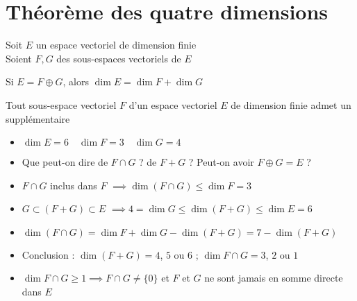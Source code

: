 \section{Théorème des quatre dimensions}

\begin{frame}
Soit $E$ un espace vectoriel de dimension finie \\
Soient $F,G$ des sous-espaces vectoriels de $E$
\begin{theoreme}
\end{theoreme}

\medskip
\pause

\begin{corollaire}
Si $E = F \oplus G$, alors $\dim E = \dim F + \dim G$
\end{corollaire}

\medskip
\pause

\begin{corollaire}
Tout sous-espace vectoriel $F$ d'un espace vectoriel $E$
de dimension finie admet un supplémentaire
\end{corollaire}

\end{frame}


\begin{frame}
\begin{exemple}
\begin{itemize}
\item
$\dim E = 6 \quad \dim F = 3 \quad \dim G = 4$

\pause
\item
Que peut-on dire de $F\cap G$ ? de $F+G$ ? Peut-on avoir $F\oplus G=E$ ?
  \pause

  \item $F \cap G$  inclus dans $F$  $\implies \dim (F \cap G) \le \dim F=3$
 
  
  \pause
  \item $G \subset (F+G) \subset E$ 
  $\implies 4=\dim G \le \dim(F+G) \le \dim E=6$
  
    \pause
  \item 
  $\dim(F\cap G) =  \dim F + \dim G - \dim(F+G) =  7-\dim(F+G)$

  \pause
  \item Conclusion : $\dim (F+G) = 4$, $5$ ou $6$ ; $\dim F \cap G = 3$, $2$ ou $1$
  
  \pause
  \item $\dim F \cap G \geq 1\implies F \cap G \neq \{0\}$ et  $F$ et $G$ ne sont jamais en somme directe
  dans $E$

\end{itemize}
\end{exemple}
\end{frame}



